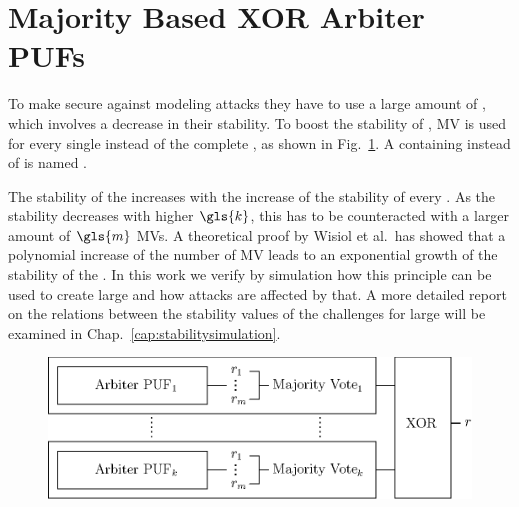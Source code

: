
\section{Majority Based XOR Arbiter PUFs}
\label{sec:majorityxorarbiter}

To make \xpufs secure against modeling attacks they have to use a large amount of \apufs, which involves a decrease in their stability.
To boost the stability of \xpufs, \ac{MV} is used for every single \apuf instead of the complete \xpuf, as shown in Fig.\ \ref{fig:majorityxorarbiter}.
A \xpuf containing \mpufs instead of \apufs is named \mxpuf.

The stability of the \xpuf increases with the increase of the stability of every \mpuf.
As the stability decreases with higher $\gls{k}$, this has to be counteracted with a larger amount of $\gls{m}$ \acp{MV}.
A theoretical proof by Wisiol et al.\ has showed that a polynomial increase of the number of \ac{MV} leads to an exponential growth of the stability of the \mxpuf \cite{Wisiol2017WhyPUFs}.
In this work we verify by simulation how this principle can be used to create large \mxpufs and how attacks are affected by that.
A more detailed report on the relations between the stability values of the challenges for large \mxpufs will be examined in Chap.\ \ref{cap:stabilitysimulation}.


\begin{figure}[ht]
\centering
\includegraphics[width=1.00\textwidth]{images/majority_xor_arbiter_v2.eps}
\caption[Majority \acs{XOR} \apuf]{\mxpuf}
\label{fig:majorityxorarbiter}
\end{figure}


